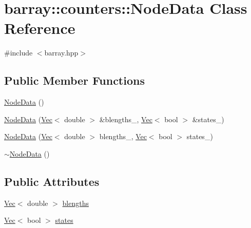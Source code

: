 \hypertarget{classbarray_1_1counters_1_1_node_data}{}\section{barray\+:\+:counters\+:\+:Node\+Data Class Reference}
\label{classbarray_1_1counters_1_1_node_data}


{\ttfamily \#include $<$barray.\+hpp$>$}

\subsection*{Public Member Functions}
\begin{DoxyCompactItemize}
\item 
\hyperlink{classbarray_1_1counters_1_1_node_data_ac81efe4d55a03d7e2c01b85fd4a7bb03}{Node\+Data} ()
\item 
\hyperlink{classbarray_1_1counters_1_1_node_data_a34055795a0c4d33ed8546f59cb574c2c}{Node\+Data} (\hyperlink{namespacebarray_1_1counters_a7899949c19d9915ddc164b59004adbd2}{Vec}$<$ double $>$ \&blengths\+\_\+, \hyperlink{namespacebarray_1_1counters_a7899949c19d9915ddc164b59004adbd2}{Vec}$<$ bool $>$ \&states\+\_\+)
\item 
\hyperlink{classbarray_1_1counters_1_1_node_data_a3c0f645c13147a3dbe814de63db09088}{Node\+Data} (\hyperlink{namespacebarray_1_1counters_a7899949c19d9915ddc164b59004adbd2}{Vec}$<$ double $>$ blengths\+\_\+, \hyperlink{namespacebarray_1_1counters_a7899949c19d9915ddc164b59004adbd2}{Vec}$<$ bool $>$ states\+\_\+)
\item 
\hyperlink{classbarray_1_1counters_1_1_node_data_ae30fb305999dee1477210365e8c2f585}{$\sim$\+Node\+Data} ()
\end{DoxyCompactItemize}
\subsection*{Public Attributes}
\begin{DoxyCompactItemize}
\item 
\hyperlink{namespacebarray_1_1counters_a7899949c19d9915ddc164b59004adbd2}{Vec}$<$ double $>$ \hyperlink{classbarray_1_1counters_1_1_node_data_a6b6fa71584ad100cc4215a4b8170e5d4}{blengths}
\item 
\hyperlink{namespacebarray_1_1counters_a7899949c19d9915ddc164b59004adbd2}{Vec}$<$ bool $>$ \hyperlink{classbarray_1_1counters_1_1_node_data_ab92b2415dff82a4665a68d3db7bc4305}{states}
\end{DoxyCompactItemize}


